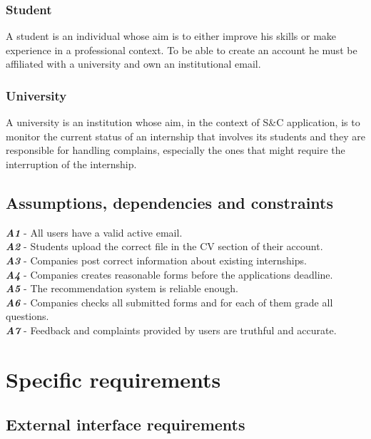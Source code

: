 \documentclass[11pt,twoside]{article}
\begin{document}
		\subsubsection{Student}
A student is an individual whose aim is to either improve his skills or make experience in a professional context. To be able to create an account he must be affiliated with a university and own an institutional email.
		\subsubsection{University}
A university is an institution whose aim, in the context of S\&C application, is to monitor the current status of an internship that involves its students and they are responsible for handling complains, especially the ones that might require the interruption of the internship.

	\subsection{Assumptions, dependencies and constraints}
\begin{spacing}{1.5}
\textbf{\textit{A1}} - All users have a valid active email. \\
\textbf{\textit{A2}} - Students upload the correct file in the CV section of their account. \\
\textbf{\textit{A3}} - Companies post correct information about existing internships. \\
\textbf{\textit{A4}} - Companies creates reasonable forms before the applications deadline. \\
\textbf{\textit{A5}} - The recommendation system is reliable enough. \\
\textbf{\textit{A6}} - Companies checks all submitted forms and for each of them grade all questions. \\
\textbf{\textit{A7}} - Feedback and complaints provided by users are truthful and accurate.
\end{spacing}
\newpage
\section{Specific requirements}
	\subsection{External interface requirements}
\end{document}
